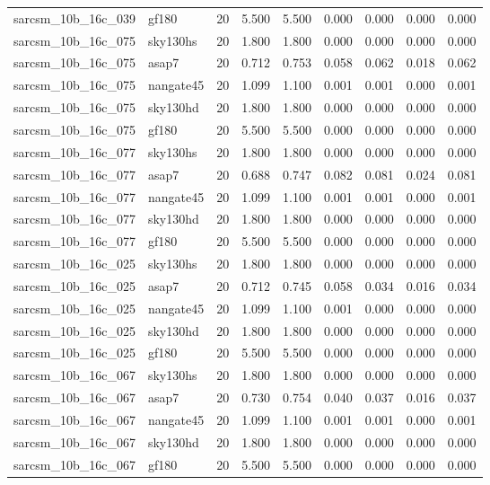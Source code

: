 \begin{tabular}{llrrrrrrr}
sarcsm\_10b\_16c\_039 & gf180 & 20 & 5.500 & 5.500 & 0.000 & 0.000 & 0.000 & 0.000 \\
sarcsm\_10b\_16c\_075 & sky130hs & 20 & 1.800 & 1.800 & 0.000 & 0.000 & 0.000 & 0.000 \\
sarcsm\_10b\_16c\_075 & asap7 & 20 & 0.712 & 0.753 & 0.058 & 0.062 & 0.018 & 0.062 \\
sarcsm\_10b\_16c\_075 & nangate45 & 20 & 1.099 & 1.100 & 0.001 & 0.001 & 0.000 & 0.001 \\
sarcsm\_10b\_16c\_075 & sky130hd & 20 & 1.800 & 1.800 & 0.000 & 0.000 & 0.000 & 0.000 \\
sarcsm\_10b\_16c\_075 & gf180 & 20 & 5.500 & 5.500 & 0.000 & 0.000 & 0.000 & 0.000 \\
sarcsm\_10b\_16c\_077 & sky130hs & 20 & 1.800 & 1.800 & 0.000 & 0.000 & 0.000 & 0.000 \\
sarcsm\_10b\_16c\_077 & asap7 & 20 & 0.688 & 0.747 & 0.082 & 0.081 & 0.024 & 0.081 \\
sarcsm\_10b\_16c\_077 & nangate45 & 20 & 1.099 & 1.100 & 0.001 & 0.001 & 0.000 & 0.001 \\
sarcsm\_10b\_16c\_077 & sky130hd & 20 & 1.800 & 1.800 & 0.000 & 0.000 & 0.000 & 0.000 \\
sarcsm\_10b\_16c\_077 & gf180 & 20 & 5.500 & 5.500 & 0.000 & 0.000 & 0.000 & 0.000 \\
sarcsm\_10b\_16c\_025 & sky130hs & 20 & 1.800 & 1.800 & 0.000 & 0.000 & 0.000 & 0.000 \\
sarcsm\_10b\_16c\_025 & asap7 & 20 & 0.712 & 0.745 & 0.058 & 0.034 & 0.016 & 0.034 \\
sarcsm\_10b\_16c\_025 & nangate45 & 20 & 1.099 & 1.100 & 0.001 & 0.000 & 0.000 & 0.000 \\
sarcsm\_10b\_16c\_025 & sky130hd & 20 & 1.800 & 1.800 & 0.000 & 0.000 & 0.000 & 0.000 \\
sarcsm\_10b\_16c\_025 & gf180 & 20 & 5.500 & 5.500 & 0.000 & 0.000 & 0.000 & 0.000 \\
sarcsm\_10b\_16c\_067 & sky130hs & 20 & 1.800 & 1.800 & 0.000 & 0.000 & 0.000 & 0.000 \\
sarcsm\_10b\_16c\_067 & asap7 & 20 & 0.730 & 0.754 & 0.040 & 0.037 & 0.016 & 0.037 \\
sarcsm\_10b\_16c\_067 & nangate45 & 20 & 1.099 & 1.100 & 0.001 & 0.001 & 0.000 & 0.001 \\
sarcsm\_10b\_16c\_067 & sky130hd & 20 & 1.800 & 1.800 & 0.000 & 0.000 & 0.000 & 0.000 \\
sarcsm\_10b\_16c\_067 & gf180 & 20 & 5.500 & 5.500 & 0.000 & 0.000 & 0.000 & 0.000 \\

\end{tabular}
